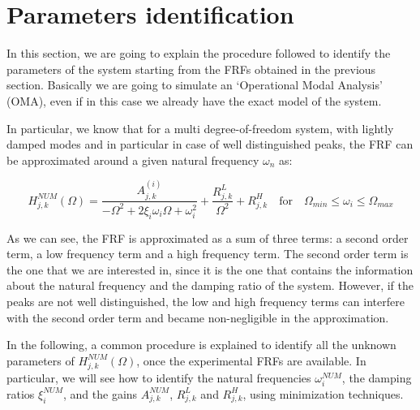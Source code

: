 \section{Parameters identification}
\label{sec:parameters_identification}

In this section, we are going to explain the procedure followed to identify the parameters of the system starting from the FRFs obtained in the previous section.
Basically we are going to simulate an `Operational Modal Analysis' (OMA), even if in this case we already have the exact model of the system.

In particular, we know that for a multi degree-of-freedom system, with lightly damped modes and in particular in case of well distinguished peaks, the FRF can be approximated around a given natural frequency $\omega_n$ as:

\begin{equation}
    H_{j, k}^{NUM}(\Omega) = \frac{A_{j, k}^{(i)}}{-\Omega^2 + 2 \xi_i \omega_i \Omega + \omega_i^2} + \frac{R_{j, k}^L}{\Omega^2} + R_{j, k}^{H} \quad \text{for} \quad \Omega_{min} \leq \omega_i \leq \Omega_{max}
    \label{eq:FRF_approximation}
\end{equation}

As we can see, the FRF is approximated as a sum of three terms: a second order term, a low frequency term and a high frequency term.
The second order term is the one that we are interested in, since it is the one that contains the information about the natural frequency and the damping ratio of the system.
However, if the peaks are not well distinguished, the low and high frequency terms can interfere with the second order term and became non-negligible in the approximation.

In the following, a common procedure is explained to identify all the unknown parameters of $H_{j, k}^{NUM}(\Omega)$, once the experimental FRFs are available.
In particular, we will see how to identify the natural frequencies $\omega_i^{NUM}$, the damping ratios $\xi_i^{NUM}$, and the gains $A_{j, k}^{NUM}$, $R_{j, k}^L$ and $R_{j, k}^H$, using minimization techniques.




